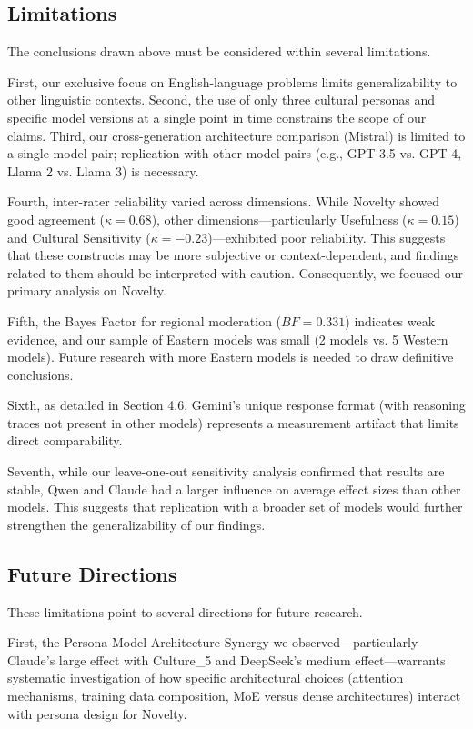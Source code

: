 \documentclass{article}
\begin{document}
\subsection{Limitations}

The conclusions drawn above must be considered within several limitations.

First, our exclusive focus on English-language problems limits generalizability to other linguistic contexts. Second, the use of only three cultural personas and specific model versions at a single point in time constrains the scope of our claims. Third, our cross-generation architecture comparison (Mistral) is limited to a single model pair; replication with other model pairs (e.g., GPT-3.5 vs. GPT-4, Llama 2 vs. Llama 3) is necessary.

Fourth, inter-rater reliability varied across dimensions. While Novelty showed good agreement (\(\kappa = 0.68\)), other dimensions—particularly Usefulness (\(\kappa = 0.15\)) and Cultural Sensitivity (\(\kappa = -0.23\))—exhibited poor reliability. This suggests that these constructs may be more subjective or context-dependent, and findings related to them should be interpreted with caution. Consequently, we focused our primary analysis on Novelty.

Fifth, the Bayes Factor for regional moderation (\(BF = 0.331\)) indicates weak evidence, and our sample of Eastern models was small (2 models vs. 5 Western models). Future research with more Eastern models is needed to draw definitive conclusions.

Sixth, as detailed in Section 4.6, Gemini's unique response format (with reasoning traces not present in other models) represents a measurement artifact that limits direct comparability.

Seventh, while our leave-one-out sensitivity analysis confirmed that results are stable, Qwen and Claude had a larger influence on average effect sizes than other models. This suggests that replication with a broader set of models would further strengthen the generalizability of our findings.

\subsection{Future Directions}

These limitations point to several directions for future research.

First, the Persona-Model Architecture Synergy we observed—particularly Claude's large effect with Culture\_5 and DeepSeek's medium effect—warrants systematic investigation of how specific architectural choices (attention mechanisms, training data composition, MoE versus dense architectures) interact with persona design for Novelty.
\end{document}
